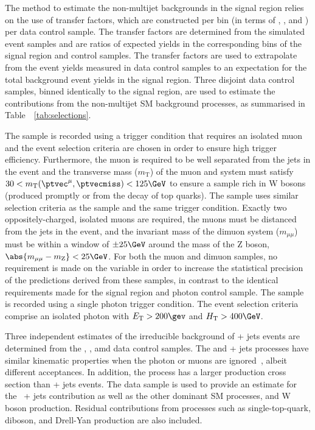 The method to estimate the non-multijet backgrounds in the signal
region relies on the use of transfer factors, which are constructed
per bin (in terms of \njet, \nb, and \scalht) per data control
sample. The transfer factors are determined from the simulated event
samples and are ratios of expected yields in the corresponding bins of
the signal region and control samples. The transfer factors are used
to extrapolate from the event yields measured in data control samples
to an expectation for the total background event yields in the signal
region.  Three disjoint data control samples, binned identically to
the signal region, are used to estimate the contributions from the
non-multijet SM background processes, as summarised in
Table~~\ref{tab:selections}.

The \mj sample is recorded using a trigger condition that requires an
isolated muon and the event selection criteria are chosen in order to
ensure high trigger efficiency. Furthermore, the muon is required to
be well separated from the jets in the event and the transverse mass
($m_{\text{T}}$) of the muon and \ptvecmiss system must satisfy $30 <
m_\text{T}(\ptvec^\mu,\ptvecmiss) < 125\GeV$ to ensure a sample rich
in W bosons (produced promptly or from the decay of top quarks). The
\mmj sample uses similar selection criteria as the \mj sample and the
same trigger condition. Exactly two oppositely-charged, isolated muons
are required, the muons must be distanced from the jets in the event,
and the invariant mass of the dimuon system ($m_{\mu\mu}$) must be
within a window of $\pm 25\GeV$ around the mass of the Z boson, $
\abs{m_{\mu\mu} - m_\text{Z}} < 25\GeV$. For both the muon and dimuon
samples, no requirement is made on the variable \alphat in order to
increase the statistical precision of the predictions derived from
these samples, in contrast to the identical \alphat requirements made
for the signal region and photon control sample. The \gj sample is
recorded using a single photon trigger condition. The event selection
criteria comprise an isolated photon with $\Et > 200\gev$ and $\scalht
> 400\GeV$.

Three independent estimates of the irreducible background of \znunu +
jets events are determined from the \gj, \mmj, amd \mj data control
samples. The \gj and \zmumu + jets processes have similar kinematic
properties when the photon or muons are ignored~\cite{Bern:2011pa}, 
albeit different acceptances. In addition, the \gj process has a
larger production cross section than \znunu + jets events. The \mj
data sample is used to provide an estimate for the \znunu\ + jets
contribution as well as the other dominant SM processes, \ttbar and W
boson production. Residual contributions from processes such as
single-top-quark, diboson, and Drell-Yan production are also included.

